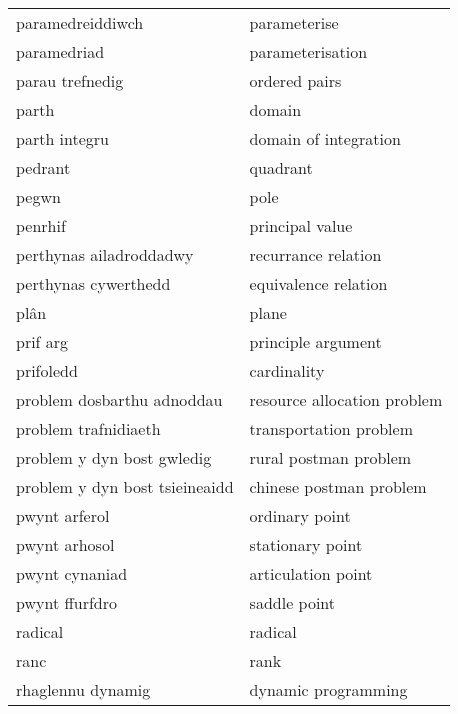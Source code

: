 \begin{supertabular}{p{0.22\textwidth}p{0.22\textwidth}}
               paramedreiddiwch &                     parameterise \\
                    paramedriad &                 parameterisation \\
                parau trefnedig &                    ordered pairs \\
                          parth &                           domain \\
                  parth integru &            domain of integration \\
                        pedrant &                         quadrant \\
                          pegwn &                             pole \\
                        penrhif &                  principal value \\
        perthynas ailadroddadwy &              recurrance relation \\
           perthynas cywerthedd &             equivalence relation \\
                           plân &                            plane \\
                       prif arg &               principle argument \\
                      prifoledd &                      cardinality \\
     problem dosbarthu adnoddau &      resource allocation problem \\
           problem trafnidiaeth &           transportation problem \\
     problem y dyn bost gwledig &            rural postman problem \\
 problem y dyn bost tsieineaidd &          chinese postman problem \\
                  pwynt arferol &                   ordinary point \\
                  pwynt arhosol &                 stationary point \\
                 pwynt cynaniad &               articulation point \\
                 pwynt ffurfdro &                     saddle point \\
                        radical &                          radical \\
                           ranc &                             rank \\
              rhaglennu dynamig &              dynamic programming \\

\end{supertabular}
